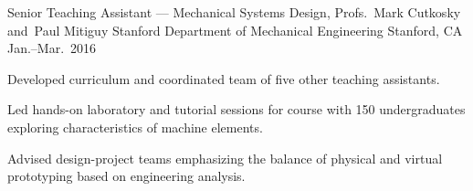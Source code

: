 \begin{cventries}
  \cventry%
    {Senior Teaching Assistant --- Mechanical Systems Design, Profs.~Mark Cutkosky and~Paul Mitiguy}
    {Stanford Department of Mechanical Engineering}
    {Stanford, CA}
    {Jan.--Mar.\ 2016}
    {
      \begin{cvitems}
        \item{Developed curriculum and coordinated team of five other teaching assistants.}
        \item{Led hands-on laboratory and tutorial sessions for course with 150 undergraduates exploring characteristics of machine elements.}
        \item{Advised design-project teams emphasizing the balance of physical and virtual prototyping based on engineering analysis.}
      \end{cvitems}
    }
\end{cventries}
